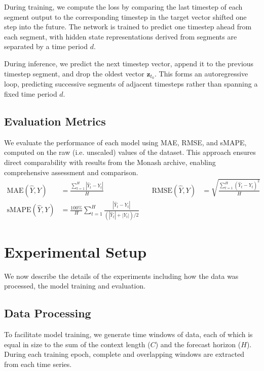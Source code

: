 \documentclass[letterpaper]{article}
\newcommand{\horizon}{H}
\newcommand{\contextlength}{C}
\newcommand{\ts}{t}
\begin{document}
During training, we compute the loss by comparing the last timestep of each segment output to the corresponding timestep in the 
target vector shifted one step into the future. The network is trained to predict one timestep ahead from each segment, with hidden 
state representations derived from segments are separated by a time period $d$.

During inference, we predict the next timestep vector, append it to the previous timestep segment, and drop the oldest vector $\mathbf{z}_{t_0}$. 
This forms an autoregressive loop, predicting successive segments of adjacent timesteps rather than spanning a fixed time period $d$.

\subsection{Evaluation Metrics}
We evaluate the performance of each model using MAE, RMSE, and sMAPE, computed on the raw (i.e. unscaled) 
values of the dataset. This approach ensures direct comparability with results from 
the Monash archive\cite{DBLP:conf/nips/GodahewaBWHM21}, enabling comprehensive assessment and comparison.
\begin{equation*}
\begin{aligned}
\text{MAE}(\hat{Y}, Y) &= \frac{ \sum_{\ts=1}^{\horizon}|\hat{Y}_\ts - Y_\ts|}{\horizon} &
\quad
\text{RMSE}(\hat{Y}, Y) &= \sqrt{\frac{\sum_{\ts=1}^{\horizon}(\hat{Y}_\ts - Y_\ts)^2}{\horizon}} \\
\text{sMAPE}(\hat{Y}, Y) &= \frac{100\%}{\horizon}\sum_{\ts=1}^{\horizon}\frac{|\hat{Y}_\ts - Y_\ts|}{(|\hat{Y}_\ts| + |Y_\ts|)/2}
\end{aligned}
\end{equation*}
\section{Experimental Setup}
We now describe the details of the experiments including how the data was processed, the 
model training and evaluation.

\subsection{Data Processing}
To facilitate model training, we generate time windows of data, each of which is equal in 
size to the sum of the context length ($\contextlength$) and the forecast horizon ($\horizon$). During each training epoch, 
complete and overlapping windows are extracted from each time series. 
\end{document}
